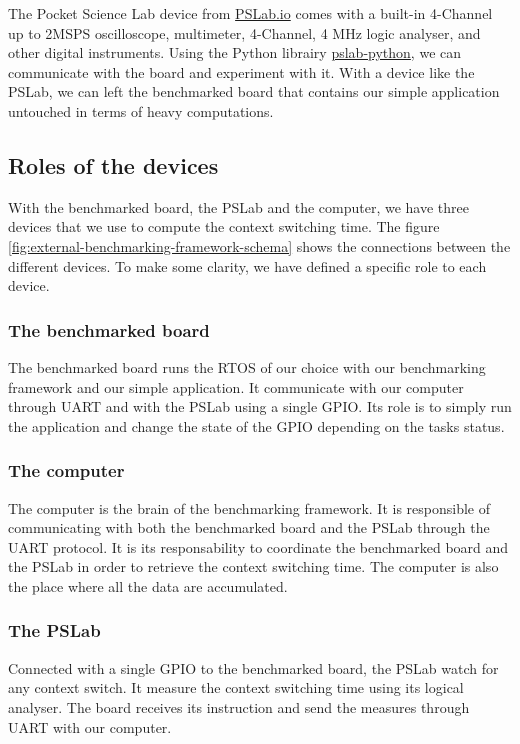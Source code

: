 The Pocket Science Lab device from \href{https://pslab.io}{PSLab.io} comes with a built-in 4-Channel up to 2MSPS oscilloscope, multimeter, 4-Channel, 4 MHz logic analyser, and other digital instruments.
Using the Python librairy \href{https://github.com/fossasia/pslab-python}{pslab-python}, we can communicate with the board and experiment with it.
With a device like the PSLab, we can left the benchmarked board that contains our simple application untouched in terms of heavy computations.

\subsection{Roles of the devices}

With the benchmarked board, the PSLab and the computer, we have three devices that we use to compute the context switching time.
The figure \ref{fig:external-benchmarking-framework-schema} shows the connections between the different devices.
To make some clarity, we have defined a specific role to each device.

\subsubsection{The benchmarked board}
The benchmarked board runs the RTOS of our choice with our benchmarking framework and our simple application.
It communicate with our computer through UART and with the PSLab using a single GPIO.
Its role is to simply run the application and change the state of the GPIO depending on the tasks status.

\subsubsection{The computer}
The computer is the brain of the benchmarking framework.
It is responsible of communicating with both the benchmarked board and the PSLab through the UART protocol.
It is its responsability to coordinate the benchmarked board and the PSLab in order to retrieve the context switching time.
The computer is also the place where all the data are accumulated.

\subsubsection{The PSLab}
Connected with a single GPIO to the benchmarked board, the PSLab watch for any context switch.
It measure the context switching time using its logical analyser.
The board receives its instruction and send the measures through UART with our computer.

